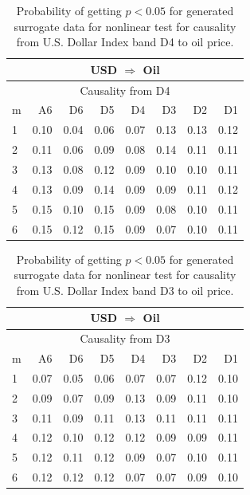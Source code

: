 %
%
\begin{table}[H]
\begin{center}
\begin{tabular}{l|r r r r r r r}
\hline\hline
\multicolumn{8}{c}{USD $\Rightarrow$ Oil}\\
\hline
\multicolumn{8}{c}{Causality from D4}\\
\hline\hline
m & A6 & D6 & D5 & D4 & D3 & D2 & D1 \\
\hline
1 & 0.10 & 0.04 & 0.06 & 0.07 & 0.13 & 0.13 & 0.12 \\
2 & 0.11 & 0.06 & 0.09 & 0.08 & 0.14 & 0.11 & 0.11 \\
3 & 0.13 & 0.08 & 0.12 & 0.09 & 0.10 & 0.10 & 0.11 \\
4 & 0.13 & 0.09 & 0.14 & 0.09 & 0.09 & 0.11 & 0.12 \\
5 & 0.15 & 0.10 & 0.15 & 0.09 & 0.08 & 0.10 & 0.11 \\
6 & 0.15 & 0.12 & 0.15 & 0.09 & 0.07 & 0.10 & 0.11 \\
\hline\hline
\end{tabular}
\caption{Probability of getting $p < 0.05$ for generated surrogate data for nonlinear test for causality from U.S. Dollar Index band D4 to oil price.}
\end{center}
\end{table}

%
%
\begin{table}[H]
\begin{center}
\begin{tabular}{l|r r r r r r r}
\hline\hline
\multicolumn{8}{c}{USD $\Rightarrow$ Oil}\\
\hline
\multicolumn{8}{c}{Causality from D3}\\
\hline\hline
m & A6 & D6 & D5 & D4 & D3 & D2 & D1 \\
\hline
1 & 0.07 & 0.05 & 0.06 & 0.07 & 0.07 & 0.12 & 0.10 \\
2 & 0.09 & 0.07 & 0.09 & 0.13 & 0.09 & 0.11 & 0.10 \\
3 & 0.11 & 0.09 & 0.11 & 0.13 & 0.11 & 0.11 & 0.11 \\
4 & 0.12 & 0.10 & 0.12 & 0.12 & 0.09 & 0.09 & 0.11 \\
5 & 0.12 & 0.11 & 0.12 & 0.09 & 0.07 & 0.10 & 0.11 \\
6 & 0.12 & 0.12 & 0.12 & 0.07 & 0.07 & 0.09 & 0.10 \\
\hline\hline
\end{tabular}
\caption{Probability of getting $p < 0.05$ for generated surrogate data for nonlinear test for causality from U.S. Dollar Index band D3 to oil price.}
\end{center}
\end{table}

